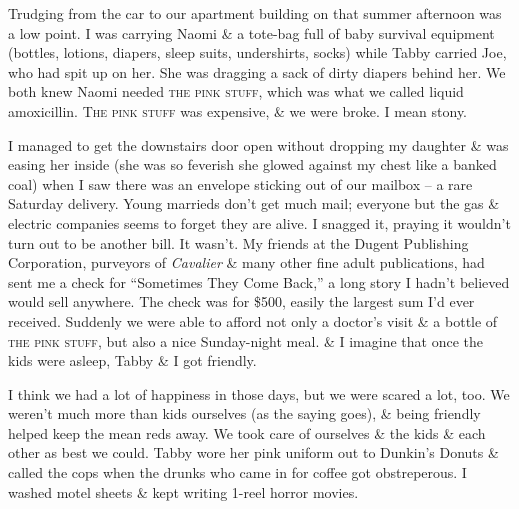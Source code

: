 \documentclass{article}
\numberwithin{equation}{section}
\begin{document}
Trudging from the car to our apartment building on that summer afternoon was a low point. I was carrying Naomi \& a tote-bag full of baby survival equipment (bottles, lotions, diapers, sleep suits, undershirts, socks) while Tabby carried Joe, who had spit up on her. She was dragging a sack of dirty diapers behind her. We both knew Naomi needed \textsc{the pink stuff}, which was what we called liquid amoxicillin. \textsc{The pink stuff} was expensive, \& we were broke. I mean stony.

I managed to get the downstairs door open without dropping my daughter \& was easing her inside (she was so feverish she glowed against my chest like a banked coal) when I saw there was an envelope sticking out of our mailbox -- a rare Saturday delivery. Young marrieds don't get much mail; everyone but the gas \& electric companies seems to forget they are alive. I snagged it, praying it wouldn't turn out to be another bill. It wasn't. My friends at the Dugent Publishing Corporation, purveyors of \textit{Cavalier} \& many other fine adult publications, had sent me a check for ``Sometimes They Come Back,'' a long story I hadn't believed would sell anywhere. The check was for \$500, easily the largest sum I'd ever received. Suddenly we were able to afford not only a doctor's visit \& a bottle of \textsc{the pink stuff}, but also a nice Sunday-night meal. \& I imagine that once the kids were asleep, Tabby \& I got friendly.

I think we had a lot of happiness in those days, but we were scared a lot, too. We weren't much more than kids ourselves (as the saying goes), \& being friendly helped keep the mean reds away. We took care of ourselves \& the kids \& each other as best we could. Tabby wore her pink uniform out to Dunkin's Donuts \& called the cops when the drunks who came in for coffee got obstreperous. I washed motel sheets \& kept writing 1-reel horror movies.
\end{document}

